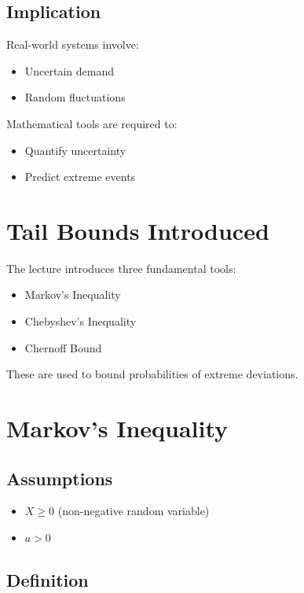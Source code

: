 \documentclass[12pt]{article}
\begin{document}
\subsection{Implication}

Real-world systems involve:

\begin{itemize}
\item Uncertain demand
\item Random fluctuations
\end{itemize}

Mathematical tools are required to:

\begin{itemize}
\item Quantify uncertainty
\item Predict extreme events
\end{itemize}

\section{Tail Bounds Introduced}

The lecture introduces three fundamental tools:

\begin{itemize}
\item Markov's Inequality
\item Chebyshev's Inequality
\item Chernoff Bound
\end{itemize}

These are used to bound probabilities of extreme deviations.

\section{Markov's Inequality}

\subsection{Assumptions}

\begin{itemize}
\item $X \ge 0$ (non-negative random variable)
\item $a > 0$
\end{itemize}

\subsection{Definition}
\end{document}
